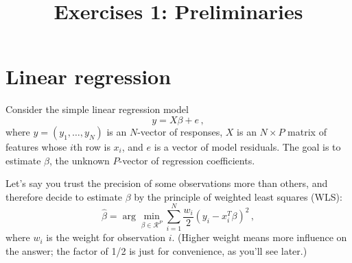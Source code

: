 \documentclass{mynotes}
\title[Exercises 1 $\cdot$ SDS 385]{Exercises 1: Preliminaries}
\date{}  %
\begin{document}
\maketitle%

\section{Linear regression}

Consider the simple linear regression model
$$
y = X \beta + e \, ,
$$
where $y = (y_1, \ldots, y_N)$ is an $N$-vector of responses, $X$ is an $N \times P$ matrix of features whose $i$th row is $x_i$, and $e$ is a vector of model residuals.  The goal is to estimate $\beta$, the unknown $P$-vector of regression coefficients.  

Let's say you trust the precision of some observations more than others, and therefore decide to estimate $\beta$ by the principle of weighted least squares (WLS):
$$
\hat{\beta} = \arg \min_{\beta \in \mathcal{R}^P} \sum_{i=1}^N \frac{w_i}{2}(y_i - x_i^T \beta)^2 \, ,
$$
where $w_i$ is the weight for observation $i$.  (Higher weight means more influence on the answer; the factor of 1/2 is just for convenience, as you'll see later.)
\end{document}
